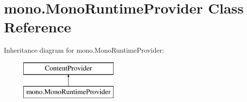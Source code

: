 \hypertarget{classmono_1_1_mono_runtime_provider}{}\section{mono.\+Mono\+Runtime\+Provider Class Reference}
\label{classmono_1_1_mono_runtime_provider}
Inheritance diagram for mono.\+Mono\+Runtime\+Provider\+:\begin{figure}[H]
\begin{center}
\leavevmode
\includegraphics[height=2.000000cm]{classmono_1_1_mono_runtime_provider}
\end{center}
\end{figure}
